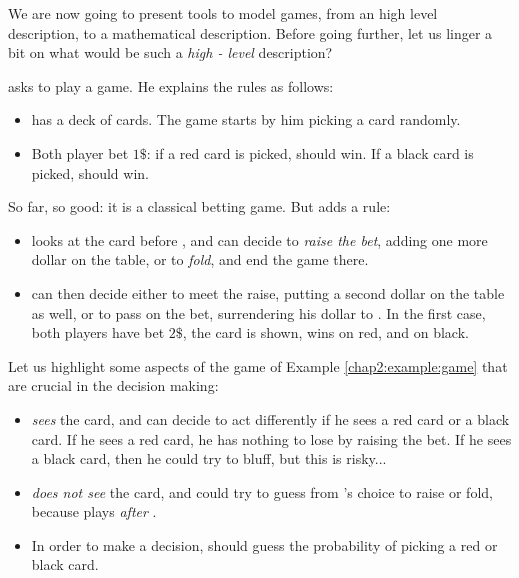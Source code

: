 We are now going to present tools to model games, from an high level description, to a mathematical description. Before going further, let us linger a bit on what would be such a \emph{high - level} description?
\begin{example}
\label{chap2:example:game}
\TAtwo{} asks \TAone{} to play a game. He explains the rules as follows:
\begin{itemize}
\item \TAtwo{} has a deck of cards. The game starts by him picking a card randomly.
\item Both player bet $1\$$: if a red card is picked, \TAtwo{} should win. If a black card is picked, \TAone{} should win.
\end{itemize} 
So far, so good: it is a classical betting game. But \TAtwo{} adds a rule:
\begin{itemize}
\item \TAtwo{} looks at the card before \TAone{}, and can decide to \emph{raise the bet}, adding one more dollar on the table, or to \emph{fold}, and end the game there.
 \item \TAone{} can then decide either to 
 meet the raise, 
 putting a second dollar on the table as well, 
or to pass on the bet, surrendering his dollar to \TAtwo{}. 
In the first case, both players have bet $2\$$, 
the card is shown, \TAtwo{} wins on red, and \TAone{} on black.
\end{itemize}

Let us highlight some aspects of the game of Example \ref{chap2:example:game} that are crucial in the decision making:
\begin{itemize}
\item \TAtwo{} \emph{sees} the card, and can decide to act differently if he sees a red card or a black card. If he sees a red card, he has nothing to lose by raising the bet. If he sees a black card, then he could try to bluff, but this is risky...
\item \TAone{} \emph{does not see} the card, and could try to guess from \TAtwo{}'s choice to raise or fold, because \TAone{} plays \emph{after} \TAtwo{}. 
\item In order to make a decision, \TAone{} should guess the probability of picking a red or black card. 
\end{itemize}
\end{example}


